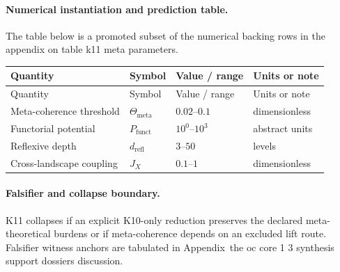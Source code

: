 \paragraph{Numerical instantiation and prediction table.}
The table below is a promoted subset of the numerical backing rows in the appendix on table k11 meta parameters.
\begin{longtable}{@{}L{0.27\textwidth}L{0.15\textwidth}L{0.24\textwidth}L{0.16\textwidth}@{}}
\toprule
Quantity & Symbol & Value / range & Units or note \\
\midrule
\endfirsthead
\toprule
Quantity & Symbol & Value / range & Units or note \\
\midrule
\endhead
Meta-coherence threshold & $\scriptstyle \Theta_{\mathrm{meta}}$ & $0.02\text{--}0.1$ & dimensionless \\
Functorial potential & $\scriptstyle P_{\mathrm{funct}}$ & $10^0\text{--}10^3$ & abstract units \\
Reflexive depth & $\scriptstyle d_{\mathrm{refl}}$ & $3\text{--}50$ & levels \\
Cross-landscape coupling & $\scriptstyle J_X$ & $0.1\text{--}1$ & dimensionless \\
\bottomrule
\end{longtable}

\paragraph{Falsifier and collapse boundary.}
K11 collapses if an explicit K10-only reduction preserves the declared meta-theoretical burdens or if meta-coherence depends on an excluded lift route.
Falsifier witness anchors are tabulated in Appendix~the oc core 1 3 synthesis support dossiers discussion.

